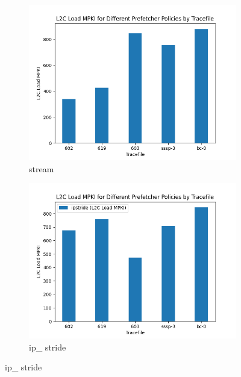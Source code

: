 \documentclass{article}
\begin{document}
\begin{figure}[h!]

\centering
\begin{subfigure}{0.5\textwidth}
  \centering
  \includegraphics[width=\linewidth]{stream_L2CLOAD.png}
  \caption{stream}
  \label{1a}
\end{subfigure}%
\begin{subfigure}{0.5\textwidth}
  \centering
  \includegraphics[width=\linewidth]{ip_L2CLOAD.png}
  \caption{ip\_ stride}
  \label{1b}
\end{subfigure}

\end{figure}
\end{document}
